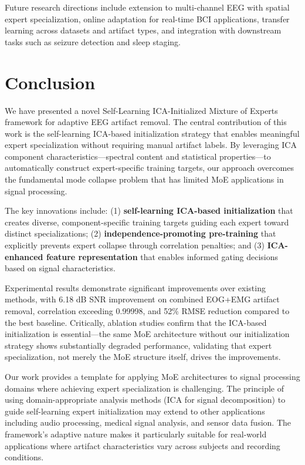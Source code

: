 \documentclass{article}
\begin{document}
Future research directions include extension to multi-channel EEG with spatial expert specialization, online adaptation for real-time BCI applications, transfer learning across datasets and artifact types, and integration with downstream tasks such as seizure detection and sleep staging.

\section{Conclusion}
\label{sec:conclusion}

We have presented a novel Self-Learning ICA-Initialized Mixture of Experts framework for adaptive EEG artifact removal. The central contribution of this work is the self-learning ICA-based initialization strategy that enables meaningful expert specialization without requiring manual artifact labels. By leveraging ICA component characteristics---spectral content and statistical properties---to automatically construct expert-specific training targets, our approach overcomes the fundamental mode collapse problem that has limited MoE applications in signal processing.

The key innovations include: (1) \textbf{self-learning ICA-based initialization} that creates diverse, component-specific training targets guiding each expert toward distinct specializations; (2) \textbf{independence-promoting pre-training} that explicitly prevents expert collapse through correlation penalties; and (3) \textbf{ICA-enhanced feature representation} that enables informed gating decisions based on signal characteristics.

Experimental results demonstrate significant improvements over existing methods, with 6.18 dB SNR improvement on combined EOG+EMG artifact removal, correlation exceeding 0.99998, and 52\% RMSE reduction compared to the best baseline. Critically, ablation studies confirm that the ICA-based initialization is essential---the same MoE architecture without our initialization strategy shows substantially degraded performance, validating that expert specialization, not merely the MoE structure itself, drives the improvements.

Our work provides a template for applying MoE architectures to signal processing domains where achieving expert specialization is challenging. The principle of using domain-appropriate analysis methods (ICA for signal decomposition) to guide self-learning expert initialization may extend to other applications including audio processing, medical signal analysis, and sensor data fusion. The framework's adaptive nature makes it particularly suitable for real-world applications where artifact characteristics vary across subjects and recording conditions.
\end{document}
